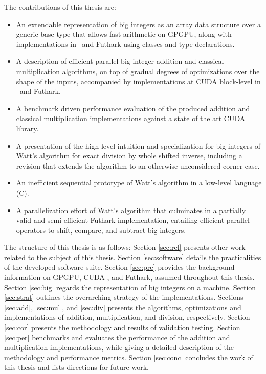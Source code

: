 The contributions of this thesis are:
\begin{itemize}
\item An extendable representation of big integers as an array data structure
  over a generic base type that allows fast arithmetic on GPGPU, along with
  implementations in \cpp\ and Futhark using classes and type declarations.
\item A description of efficient parallel big integer addition and classical
  multiplication algorithms, on top of gradual degrees of optimizations over the
  shape of the inputs, accompanied by implementations at CUDA block-level in
  \cpp\ and Futhark.
\item A benchmark driven performance evaluation of the produced addition and
  classical multiplication implementations against a state of the art CUDA
  library.
\item A presentation of the high-level intuition and specialization for big
  integers of Watt's algorithm for exact division by whole shifted inverse,
  including a revision that extends the algorithm to an otherwise unconsidered
  corner case.
\item An inefficient sequential prototype of Watt's algorithm in a low-level
  language (C).
\item A parallelization effort of Watt's algorithm that culminates in a
  partially valid and semi-efficient Futhark implementation, entailing efficient
  parallel operators to shift, compare, and subtract big integers.
\end{itemize}
\bigskip

The structure of this thesis is as follows: Section \ref{sec:rel} presents other
work related to the subject of this thesis. Section \ref{sec:software} details
the practicalities of the developed software suite. Section \ref{sec:pre}
provides the background information on GPGPU, CUDA \cpp, and Futhark, assumed
throughout this thesis. Section \ref{sec:big} regards the representation of big
integers on a machine. Section \ref{sec:strat} outlines the overarching strategy
of the implementations. Sections \ref{sec:add}, \ref{sec:mul}, and \ref{sec:div}
presents the algorithms, optimizations and implementations of addition,
multiplication, and division, respectively. Section \ref{sec:cor} presents the
methodology and results of validation testing. Section \ref{sec:per} benchmarks
and evaluates the performance of the addition and multiplication
implementations, while giving a detailed description of the methodology and
performance metrics. Section \ref{sec:conc} concludes the work of this thesis
and lists directions for future work.


